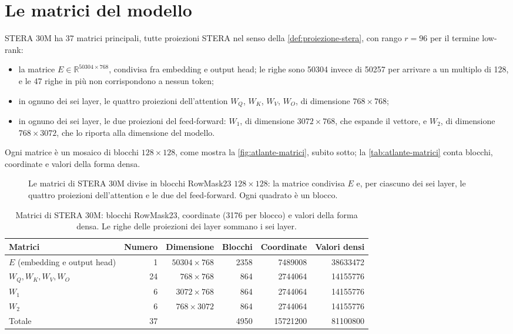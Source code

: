 \section{Le matrici del modello}
\label{sec:atlante-matrici}

STERA 30M ha 37 matrici principali, tutte proiezioni STERA nel senso della \autoref{def:proiezione-stera}, con rango $r=96$ per il termine low-rank:
\begin{itemize}
\item la matrice $E\in\mathbb{R}^{\num{50304}\times768}$, condivisa fra embedding e output head; le righe sono \num{50304} invece di \num{50257} per arrivare a un multiplo di 128, e le 47 righe in più non corrispondono a nessun token;
\item in ognuno dei sei layer, le quattro proiezioni dell'attention $W_Q$, $W_K$, $W_V$, $W_O$, di dimensione $768\times768$;
\item in ognuno dei sei layer, le due proiezioni del feed-forward: $W_1$, di dimensione $\num{3072}\times768$, che espande il vettore, e $W_2$, di dimensione $768\times\num{3072}$, che lo riporta alla dimensione del modello.
\end{itemize}
Ogni matrice è un mosaico di blocchi $128\times128$, come mostra la \autoref{fig:atlante-matrici}, subito sotto; la \autoref{tab:atlante-matrici} conta blocchi, coordinate e valori della forma densa.

\begin{figure}[H]
\centering

\caption{Le matrici di STERA 30M divise in blocchi RowMask23 $128\times128$: la matrice condivisa $E$ e, per ciascuno dei sei layer, le quattro proiezioni dell'attention e le due del feed-forward. Ogni quadrato è un blocco.}
\label{fig:atlante-matrici}
\end{figure}

\begin{table}[H]
\centering
\small
\begin{tabular}{lrrrrr}
\toprule
Matrici & Numero & Dimensione & Blocchi & Coordinate & Valori densi \\
\midrule
$E$ (embedding e output head) & 1 & $\num{50304}\times768$ & \num{2358} & \num{7489008} & \num{38633472} \\
$W_Q,W_K,W_V,W_O$ & 24 & $768\times768$ & \num{864} & \num{2744064} & \num{14155776} \\
$W_1$ & 6 & $\num{3072}\times768$ & \num{864} & \num{2744064} & \num{14155776} \\
$W_2$ & 6 & $768\times\num{3072}$ & \num{864} & \num{2744064} & \num{14155776} \\
\midrule
Totale & 37 & & \num{4950} & \num{15721200} & \num{81100800} \\
\bottomrule
\end{tabular}
\caption{Matrici di STERA 30M: blocchi RowMask23, coordinate (\num{3176} per blocco) e valori della forma densa. Le righe delle proiezioni dei layer sommano i sei layer.}
\label{tab:atlante-matrici}
\end{table}

